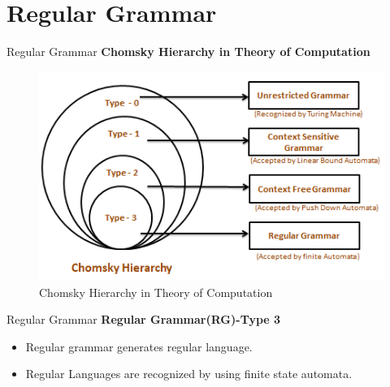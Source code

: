 \documentclass{beamer}
\begin{document}
\section{Regular Grammar}
\begin{frame}{Regular Grammar}
	\textbf{Chomsky Hierarchy in Theory of Computation}
	\begin{figure}
		\includegraphics[scale=.6]{img1/m2}
		\caption{Chomsky Hierarchy in Theory of Computation}
	\end{figure}
\end{frame}
\begin{frame}{Regular Grammar}
	\textbf{Regular Grammar(RG)-Type 3}
	\begin{itemize}
		\item Regular grammar generates regular language. 
		\item Regular Languages are recognized by using finite state automata.
	\end{itemize}

\end{frame}
\end{document}
